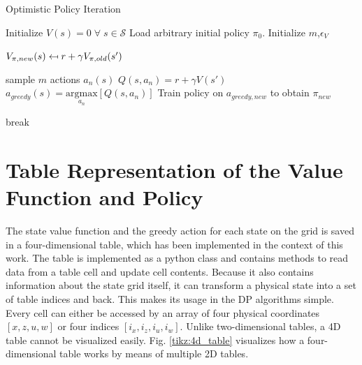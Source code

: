 \begin{algorithm}
	\caption{Optimistic Policy Iteration}
	\begin{algorithmic}[0] %

		\State Initialize $V(s) = 0 \; \forall \; s \in \mathcal{S}$
		\State Load arbitrary initial policy $\pi_0$.
		\State Initialize $m$,\;$\epsilon_V$

		\State $V_{\pi,new}(s) \mathrel{\reflectbox{\ensuremath{\mapsto}}} r+\gamma V_ {\pi,old}(s')$
		\EndFor
		\EndFunction

		\State sample $m$ actions $a_n(s)$
		\State $Q(s,a_n) = r + \gamma V(s')$
		\EndFor
		\State $a_{greedy}(s)=\underset{a_n}{\text{argmax}}[Q(s,a_n)]$
		\EndFor
		\EndFunction
			\State Train policy on $a_{greedy,new}$ to obtain $\pi_{new}$

		\State break
		\EndIf	
		\EndWhile

		\EndFunction
	\end{algorithmic}
	\label{algo:opi}
\end{algorithm}

\newpage
\section{Table Representation of the Value Function and Policy}
\label{appendix_C}

The state value function and the greedy action for each state on the grid is saved in a four-dimensional table, which has been implemented in the context of this work. The table is implemented as a python class and contains methods to read data from a table cell and update cell contents. Because it also contains information about the state grid itself, it can transform a physical state into a set of table indices and back. This makes its usage in the DP algorithms simple. Every cell can either be accessed by an array of four physical coordinates  $[x,z,u,w]$  or four indices $[i_x,i_z,i_u,i_w]$.  Unlike two-dimensional tables, a 4D table cannot be visualized easily. Fig. \ref{tikz:4d_table} visualizes how a four-dimensional table works by means of multiple 2D tables. 

